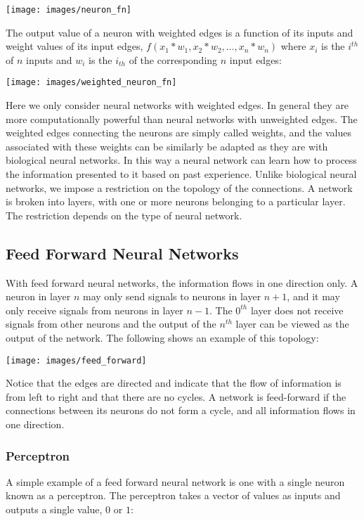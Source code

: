 \texttt{[image: images/neuron\_fn]}

The output value of a neuron with weighted edges is a function of its inputs and weight values of its input edges, $f(x_1 * w_1, x_2 * w_2, ..., x_n * w_n)$ where $x_i$ is the $i^{th}$ of $n$ inputs and $w_i$ is the $i_{th}$ of the corresponding $n$ input edges:

\texttt{[image: images/weighted\_neuron\_fn]}

Here we only consider neural networks with weighted edges. 
In general they are more computationally powerful than neural networks with unweighted edges.
The weighted edges connecting the neurons are simply called weights, and the values associated with these weights can be similarly be adapted as they are with biological neural networks. 
In this way a neural network can learn how to process the information presented to it based on past experience. 
Unlike biological neural networks, we impose a restriction on the topology of the connections.
A network is broken into layers, with one or more neurons belonging to a particular layer.
The restriction depends on the type of neural network.

\subsection{Feed Forward Neural Networks} 
With feed forward neural networks, the information flows in one direction only.
A neuron in layer $n$ may only send signals to neurons in layer $n+1$, and it may only receive signals from neurons in layer $n-1$.
The $0^{th}$ layer does not receive signals from other neurons and the output of the $n^{th}$ layer can be viewed as the output of the network.
The following shows an example of this topology:

\texttt{[image: images/feed\_forward]}

Notice that the edges are directed and indicate that the flow of information is from left to right and that there are no cycles.
A network is feed-forward if the connections between its neurons do not form a cycle, and all information flows in one direction.

\subsubsection{Perceptron}
A simple example of a feed forward neural network is one with a single neuron known as a perceptron.
The perceptron takes a vector of values as inputs and outputs a single value, $0$ or $1$:

